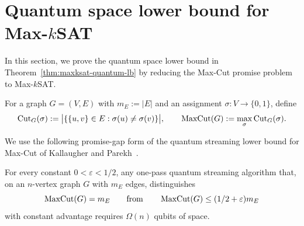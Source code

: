 
\appendix
\section{Quantum space lower bound for Max-\texorpdfstring{$k$}{k}SAT}
\label{app:maxksat-lower-bound}

In this section, we prove the quantum space lower bound in Theorem~\ref{thm:maxksat-quantum-lb} by reducing the Max-Cut promise problem to Max-$k$SAT.

For a graph $G=(V,E)$ with $m_E:=|E|$ and an assignment $\sigma:V\to\{0,1\}$, define
\[
  \operatorname{Cut}_G(\sigma)
  :=
  \bigl|\{\{u,v\}\in E:\sigma(u)\ne\sigma(v)\}\bigr|,
  \qquad
  \operatorname{MaxCut}(G):=\max_\sigma \operatorname{Cut}_G(\sigma).
\]

We use the following promise-gap form of the quantum streaming lower bound for Max-Cut of Kallaugher and Parekh~\cite{KP22}.

\begin{theorem}\cite{KP22}\label{max-cut}
For every constant $0<\varepsilon<1/2$, any one-pass quantum streaming algorithm that, on an $n$-vertex graph $G$ with $m_E$ edges, distinguishes
\[
  \operatorname{MaxCut}(G)=m_E
  \qquad\text{from}\qquad
  \operatorname{MaxCut}(G)\le (1/2+\varepsilon)m_E
\]
with constant advantage requires $\Omega(n)$ qubits of space.
\end{theorem}

